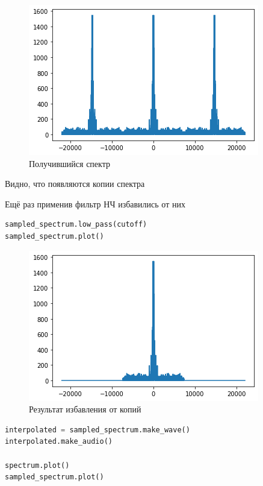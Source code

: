 \begin{figure}[H]
	\begin{center}
		\includegraphics[scale=1]{fig/lab11/lab11_04.png}
		\caption{Получившийся спектр}
	\end{center}
\end{figure}

Видно, что появляются копии спектра

Ещё раз применив фильтр НЧ избавились от них

\begin{lstlisting}[language=Python]
sampled_spectrum.low_pass(cutoff)
sampled_spectrum.plot()
\end{lstlisting}

\begin{figure}[H]
	\begin{center}
		\includegraphics[scale=1]{fig/lab11/lab11_05.png}
		\caption{Результат избавления от копий}
	\end{center}
\end{figure}


\begin{lstlisting}[language=Python]
interpolated = sampled_spectrum.make_wave()
interpolated.make_audio()

spectrum.plot()
sampled_spectrum.plot()
\end{lstlisting}

